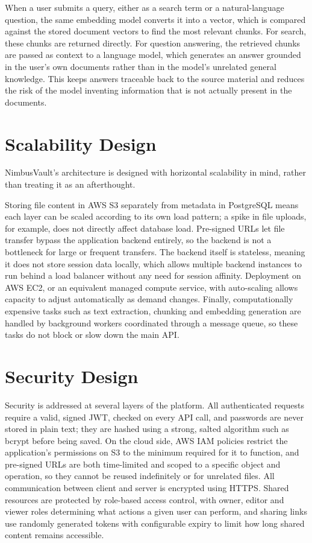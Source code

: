\documentclass[11pt,a4paper]{article}
\begin{document}
When a user submits a query, either as a search term or a natural-language question, the same embedding model converts it into a vector, which is compared against the stored document vectors to find the most relevant chunks. For search, these chunks are returned directly. For question answering, the retrieved chunks are passed as context to a language model, which generates an answer grounded in the user's own documents rather than in the model's unrelated general knowledge. This keeps answers traceable back to the source material and reduces the risk of the model inventing information that is not actually present in the documents.

\section{Scalability Design}

NimbusVault's architecture is designed with horizontal scalability in mind, rather than treating it as an afterthought.

Storing file content in AWS S3 separately from metadata in PostgreSQL means each layer can be scaled according to its own load pattern; a spike in file uploads, for example, does not directly affect database load. Pre-signed URLs let file transfer bypass the application backend entirely, so the backend is not a bottleneck for large or frequent transfers. The backend itself is stateless, meaning it does not store session data locally, which allows multiple backend instances to run behind a load balancer without any need for session affinity. Deployment on AWS EC2, or an equivalent managed compute service, with auto-scaling allows capacity to adjust automatically as demand changes. Finally, computationally expensive tasks such as text extraction, chunking and embedding generation are handled by background workers coordinated through a message queue, so these tasks do not block or slow down the main API.

\section{Security Design}

Security is addressed at several layers of the platform. All authenticated requests require a valid, signed JWT, checked on every API call, and passwords are never stored in plain text; they are hashed using a strong, salted algorithm such as bcrypt before being saved. On the cloud side, AWS IAM policies restrict the application's permissions on S3 to the minimum required for it to function, and pre-signed URLs are both time-limited and scoped to a specific object and operation, so they cannot be reused indefinitely or for unrelated files. All communication between client and server is encrypted using HTTPS. Shared resources are protected by role-based access control, with owner, editor and viewer roles determining what actions a given user can perform, and sharing links use randomly generated tokens with configurable expiry to limit how long shared content remains accessible.
\end{document}
